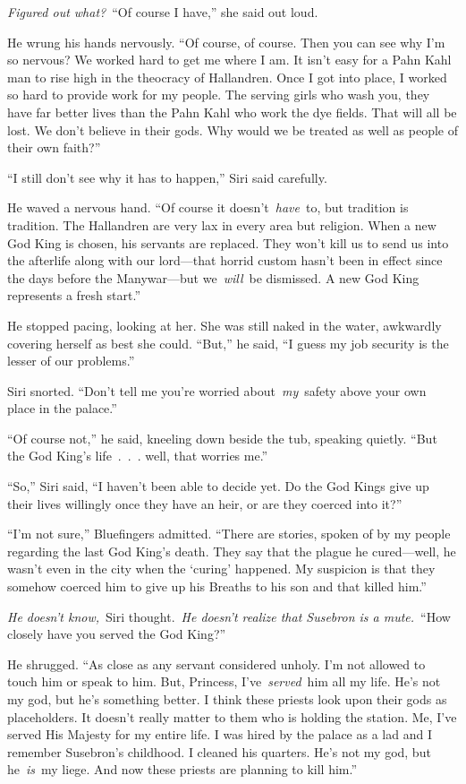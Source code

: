 \textit{Figured out what?}~“Of course I have,” she said out loud.

He wrung his hands nervously. “Of course, of course. Then you can see why I’m so nervous? We worked hard to get me where I am. It isn’t easy for a Pahn Kahl man to rise high in the theocracy of Hallandren. Once I got into place, I worked so hard to provide work for my people. The serving girls who wash you, they have far better lives than the Pahn Kahl who work the dye fields. That will all be lost. We don’t believe in their gods. Why would we be treated as well as people of their own faith?”

“I still don’t see why it has to happen,” Siri said carefully.

He waved a nervous hand. “Of course it doesn’t~\textit{have}~to, but tradition is tradition. The Hallandren are very lax in every area but religion. When a new God King is chosen, his servants are replaced. They won’t kill us to send us into the afterlife along with our lord—that horrid custom hasn’t been in effect since the days before the Manywar—but we~\textit{will}~be dismissed. A new God King represents a fresh start.”

He stopped pacing, looking at her. She was still naked in the water, awkwardly covering herself as best she could. “But,” he said, “I guess my job security is the lesser of our problems.”

Siri snorted. “Don’t tell me you’re worried about~\textit{my}~safety above your own place in the palace.”

“Of course not,” he said, kneeling down beside the tub, speaking quietly. “But the God King’s life~.~.~. well, that worries me.”

“So,” Siri said, “I haven’t been able to decide yet. Do the God Kings give up their lives willingly once they have an heir, or are they coerced into it?”

“I’m not sure,” Bluefingers admitted. “There are stories, spoken of by my people regarding the last God King’s death. They say that the plague he cured—well, he wasn’t even in the city when the ‘curing’ happened. My suspicion is that they somehow coerced him to give up his Breaths to his son and that killed him.”

\textit{He doesn’t know,}~Siri thought.~\textit{He doesn’t realize that Susebron is a mute.}~“How closely have you served the God King?”

He shrugged. “As close as any servant considered unholy. I’m not allowed to touch him or speak to him. But, Princess, I’ve~\textit{served}~him all my life. He’s not my god, but he’s something better. I think these priests look upon their gods as placeholders. It doesn’t really matter to them who is holding the station. Me, I’ve served His Majesty for my entire life. I was hired by the palace as a lad and I remember Susebron’s childhood. I cleaned his quarters. He’s not my god, but he~\textit{is}~my liege. And now these priests are planning to kill him.”

